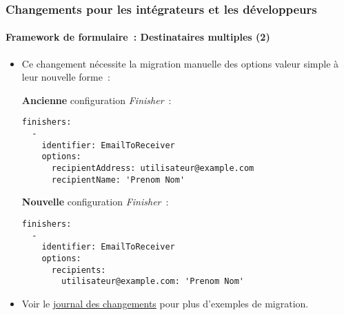 \begin{frame}[fragile]
	\frametitle{Changements pour les intégrateurs et les développeurs}
	\framesubtitle{Framework de formulaire~: Destinataires multiples (2)}

	\lstset{basicstyle=\tiny\ttfamily}

	\begin{itemize}
		\item Ce changement nécessite la migration manuelle des options valeur simple à leur nouvelle forme~:

		\smaller\textbf{Ancienne} configuration \textit{Finisher}~:\normalsize

\begin{lstlisting}
finishers:
  -
    identifier: EmailToReceiver
    options:
      recipientAddress: utilisateur@example.com
      recipientName: 'Prenom Nom'
\end{lstlisting}

		\smaller\textbf{Nouvelle} configuration \textit{Finisher}~:\normalsize

\begin{lstlisting}
finishers:
  -
    identifier: EmailToReceiver
    options:
      recipients:
        utilisateur@example.com: 'Prenom Nom'
\end{lstlisting}

		\item Voir le \href{https://docs.typo3.org/c/typo3/cms-core/10.0/en-us/Changelog/master/Deprecation-80420-EmailFinisherSingleAddressOptions.html}{journal des changements}
			pour plus d'exemples de migration.

	\end{itemize}

\end{frame}


